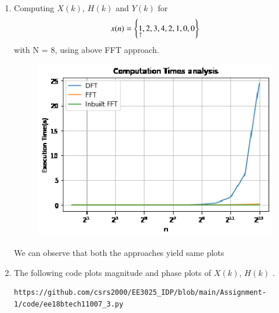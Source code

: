 \documentclass[journal,12pt,twocolumn]{IEEEtran}
\renewcommand\thesection{\arabic{section}}
\begin{document}
\begin{enumerate}[label=\thesection.\arabic*.,ref=\thesection.\theenumi]
\item Computing $X(k)$, $H(k)$ and $Y(k)$ for 
    \begin{align}
        x(n) = \left\{\underset{\uparrow}{1},2,3,4,2,1,0,0\right\}
    \end{align}
with N = 8, using above FFT approach.
\begin{figure}[!ht]
	\includegraphics[width=1.15\columnwidth]{./figs/ee18btech11007_2.eps}
\end{figure}
We can observe that both the approaches yield same plots
\item The following code plots magnitude and phase plots of $X(k)$, $H(k)$  .
\begin{lstlisting}
https://github.com/csrs2000/EE3025_IDP/blob/main/Assignment-1/code/ee18btech11007_3.py
\end{lstlisting}
\begin{figure}[!ht]

\end{figure}
\end{enumerate}
\end{document}
